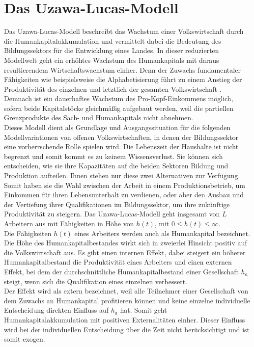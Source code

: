 \section[Das Uzawa-Lucas-Modell]{Das Uzawa-Lucas-Modell}
Das Uzawa-Lucas-Modell beschreibt das Wachstum einer Volkswirtschaft durch die Humankapitalakkumulation und vermittelt dabei die Bedeutung des Bildungssektors für die Entwicklung eines Landes. In dieser reduzierten Modellwelt geht ein erhöhtes Wachstum des Humankapitals mit daraus resultierendem Wirtschaftswachstum einher. Denn der Zuwachs fundamentaler Fähigkeiten wie beispielsweise die Alphabetisierung führt zu einem Anstieg der Produktivität des einzelnen und letztlich der gesamten Volkswirtschaft \cite{Romer.1990}. Demnach ist ein dauerhaftes Wachstum des Pro-Kopf-Einkommens möglich, sofern beide Kapitalstöcke gleichmäßig aufgebaut werden, weil die partiellen Grenzprodukte des Sach- und Humankapitals nicht abnehmen.\\
%
 Dieses Modell dient als Grundlage und Ausgangssituation für die folgenden Modellvariationen von offenen Volkswirtschaften, in denen der Bildungssektor eine vorherrschende Rolle spielen wird.
Die Lebenszeit der Haushalte ist nicht begrenzt und somit kommt es zu keinem Wissensverlust. Sie können sich entscheiden, wie sie ihre Kapazitäten auf die beiden Sektoren Bildung und Produktion aufteilen. Ihnen stehen nur diese zwei Alternativen zur Verfügung. Somit haben sie die Wahl zwischen der Arbeit in einem Produktionsbetrieb, um Einkommen für ihren Lebensunterhalt zu verdienen, oder aber den Ausbau und der Vertiefung ihrer Qualifikationen im Bildungssektor, um ihre zukünftige Produktivität zu steigern.
Das Uzawa-Lucas-Modell geht insgesamt von $L$ Arbeitern aus mit Fähigkeiten in Höhe von $h(t)$, mit $0 \le h(t)\leq \infty$.\\
%
 Die Fähigkeiten $h(t)$ eines Arbeiters werden auch als Humankapital bezeichnet. Die Höhe des Humankapitalbestandes wirkt sich in zweierlei Hinsicht positiv auf die Volkswirtschaft aus. Es gibt einen internen Effekt, dabei steigert ein höherer Humankapitalbestand die Produktivität eines Arbeiters und einen externen Effekt, bei dem der durchschnittliche Humankapitalbestand einer Gesellschaft $h_a$ steigt, wenn sich die Qualifikation eines einzelnen verbessert. \\
%
 Der Effekt wird als extern bezeichnet, weil alle Teilnehmer einer Gesellschaft von dem Zuwachs an Humankapital profitieren können und keine einzelne individuelle Entscheidung direkten Einfluss auf $h_a$ hat. Somit geht Humankapitalakkumulation mit positiven Externalitäten einher. Dieser Einfluss wird bei der individuellen Entscheidung über die Zeit nicht berücksichtigt und ist somit exogen. \\

